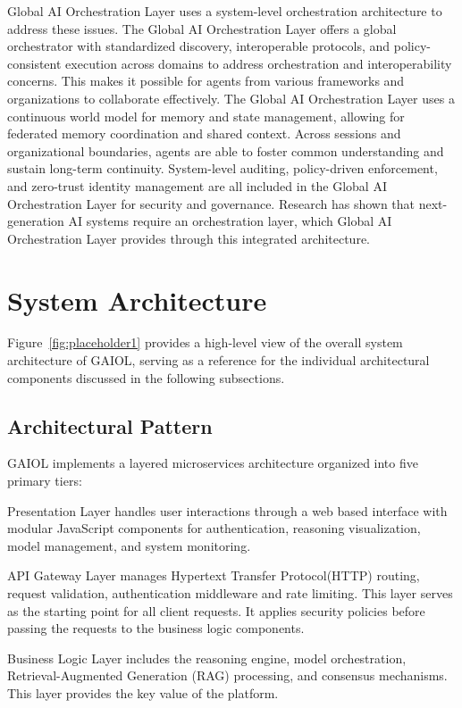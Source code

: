 \documentclass[final,5p,times,twocolumn,authoryear,draft]{elsarticle}
\begin{document}
Global AI Orchestration Layer uses a system-level orchestration architecture to address these issues. The Global AI Orchestration Layer offers a global orchestrator with standardized discovery, interoperable protocols, and policy-consistent execution across domains to address orchestration and interoperability concerns. This makes it possible for agents from various frameworks and organizations to collaborate effectively. The Global AI Orchestration Layer uses a continuous world model for memory and state management, allowing for federated memory coordination and shared context. Across sessions and organizational boundaries, agents are able to foster common understanding and sustain long-term continuity. System-level auditing, policy-driven enforcement, and zero-trust identity management are all included in the Global AI Orchestration Layer for security and governance. Research has shown that next-generation AI systems require an orchestration layer, which Global AI Orchestration Layer provides through this integrated architecture.

\section{System Architecture}
Figure~\ref{fig:placeholder1} provides a high-level view of the overall system architecture of GAIOL, serving as a reference for the individual architectural components discussed in the following subsections.

\subsection{Architectural Pattern}

GAIOL implements a layered microservices architecture organized into five primary tiers:

Presentation Layer handles user interactions through a web based interface with modular JavaScript components for authentication, reasoning visualization, model management, and system monitoring.

API Gateway Layer manages Hypertext Transfer Protocol(HTTP) routing, request validation, authentication middleware and rate limiting. This layer serves as the starting point for all client requests. It applies security policies before passing the requests to the business logic components.

Business Logic Layer includes the reasoning engine, model orchestration, Retrieval-Augmented Generation (RAG) processing, and consensus mechanisms. This layer provides the key value of the platform.
\end{document}
